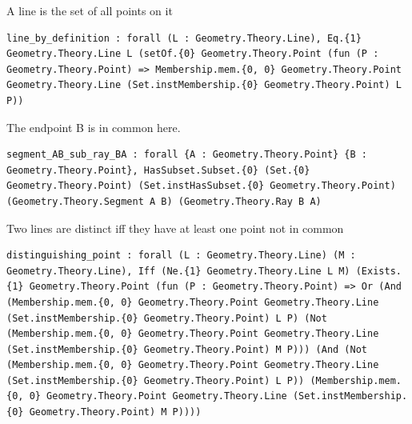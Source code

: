 \begin{theorem}
  \label{Geometry.Theory.Line.line_by_definition}
  \leanok
  A line is the set of all points on it 
\begin{verbatim}line_by_definition : forall (L : Geometry.Theory.Line), Eq.{1} Geometry.Theory.Line L (setOf.{0} Geometry.Theory.Point (fun (P : Geometry.Theory.Point) => Membership.mem.{0, 0} Geometry.Theory.Point Geometry.Theory.Line (Set.instMembership.{0} Geometry.Theory.Point) L P))\end{verbatim}
\end{theorem}

\begin{theorem}
  \label{Geometry.Theory.Line.segment_AB_sub_ray_BA}
  \leanok
  The endpoint B is in common here. 
\begin{verbatim}segment_AB_sub_ray_BA : forall {A : Geometry.Theory.Point} {B : Geometry.Theory.Point}, HasSubset.Subset.{0} (Set.{0} Geometry.Theory.Point) (Set.instHasSubset.{0} Geometry.Theory.Point) (Geometry.Theory.Segment A B) (Geometry.Theory.Ray B A)\end{verbatim}
\end{theorem}

\begin{theorem}
  \label{Geometry.Theory.Line.distinguishing_point}
  \leanok
  Two lines are distinct iff they have at least one point not in common 
\begin{verbatim}distinguishing_point : forall (L : Geometry.Theory.Line) (M : Geometry.Theory.Line), Iff (Ne.{1} Geometry.Theory.Line L M) (Exists.{1} Geometry.Theory.Point (fun (P : Geometry.Theory.Point) => Or (And (Membership.mem.{0, 0} Geometry.Theory.Point Geometry.Theory.Line (Set.instMembership.{0} Geometry.Theory.Point) L P) (Not (Membership.mem.{0, 0} Geometry.Theory.Point Geometry.Theory.Line (Set.instMembership.{0} Geometry.Theory.Point) M P))) (And (Not (Membership.mem.{0, 0} Geometry.Theory.Point Geometry.Theory.Line (Set.instMembership.{0} Geometry.Theory.Point) L P)) (Membership.mem.{0, 0} Geometry.Theory.Point Geometry.Theory.Line (Set.instMembership.{0} Geometry.Theory.Point) M P))))\end{verbatim}
\end{theorem}

